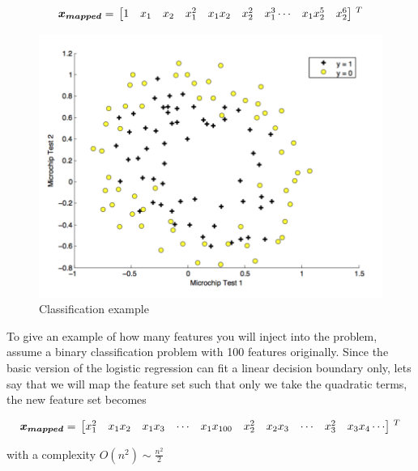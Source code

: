 \begin{equation}{\label{eqn:featureMapping2}}
\bm{x_{mapped}}
=\,
\begin{bmatrix}
1 & x_1 & x_2 & x_1^2 & x_1x_2 & x_2^2 & x_1^3 \cdots & x_1x_2^5 & x_2^6 
\end{bmatrix}
\,^ T
\end{equation} 

\begin{figure}
\begin{center}
\includegraphics[width=13cm]{figures/classificationMicrochip}    %
\caption{Classification example} 
\label{fig:classificationEx3}
\end{center}
\end{figure}

To give an example of how many features you will inject 
into the problem, assume a binary classification problem 
with 100 features originally. Since the basic version of the 
logistic regression can fit a linear decision boundary only, 
let\textquotesingle s say that we will map the feature set 
such that only we take the quadratic terms, the new feature set becomes
 
\begin{equation}{\label{eqn:featureMapping3}}
\bm{x_{mapped}}
=\,
\begin{bmatrix}
x_1^2 & x_1x_2 & x_1x_3 & \cdots & x_1x_{100} & x_2^2 & x_2x_3 & \cdots & x_3^2 & x_3x_4  \cdots  
\end{bmatrix}
\,^ T
\end{equation} 

with a complexity $O(n^2) \sim \frac{n^2}{2}$

